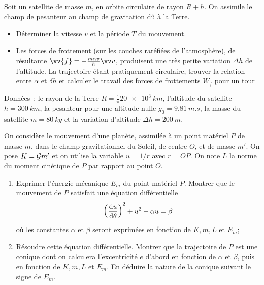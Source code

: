 \begin{exercice}%
  Soit un satellite de masse \(m\), en orbite circulaire de rayon \(R+h\). On
  assimile le champ de pesanteur au champ de gravitation dû à la Terre.
  \begin{itemize}%
    \item Déterminer la vitesse \(v\) et la période \(T\) du mouvement.
    \item Les forces de frottement (sur les couches raréfiées de l'atmosphère),
      de résultante \(\vv{f} = -\frac{m\alpha v}{h} \vvv\), produisent une très
      petite variation \(\Delta h\) de l'altitude. La trajectoire étant
      pratiquement circulaire, trouver la relation entre \(\alpha\) et
      \(\delta h\) et calculer le travail des forces de frottements \(W_f\)
      pour un tour
  \end{itemize}%
  Données~: le rayon de la Terre \(R = \frac{1}{\pi}\SI{20e3}{km}\), l'altitude
  du satellite \(h=\SI{300}{km}\), la pesanteur pour une altitude nulle
  \(g_0 = \SI{9.81}{m.s}\), la masse du satellite \(m = \SI{80}{kg}\) et la
  variation d'altitude \(\Delta h = \SI{200}{m}\).
\end{exercice}%
\begin{exercice}%
  On considère le mouvement d'une planète, assimilée à un point matériel \(P\)
  de masse \(m\), dans le champ gravitationnel du Soleil, de centre \(O\), et
  de masse \(m'\). On pose \(K = \mathcal{G} m'\) et on utilise la variable \(u=1/r\)
  avec \(r = OP\). On note \(L\) la norme du moment cinétique de \(P\) par
  rapport au point \(O\).
  \begin{enumerate}%
    \item Exprimer l'énergie mécanique \(E_m\) du point matériel \(P\). Montrer
      que le mouvement de \(P\) satisfait une équation différentielle
      \begin{equation}
        {\left(\dfrac{\mathrm{d}u}{\mathrm{d}\theta}\right)}^2 + u^2 -\alpha u = \beta
      \end{equation}
      où les constantes \(\alpha\) et \(\beta\) seront exprimées en fonction de
      \(K, m, L\) et \(E_m\);
    \item Résoudre cette équation différentielle. Montrer que la trajectoire de
      \(P\) est une conique dont on calculera l'excentricité \(e\) d'abord en
      fonction de \(\alpha\) et \(\beta\), puis en fonction de \(K, m, L\) et
      \(E_m\). En déduire la nature de la conique suivant le signe de \(E_m\).
  \end{enumerate}%
\end{exercice}%
